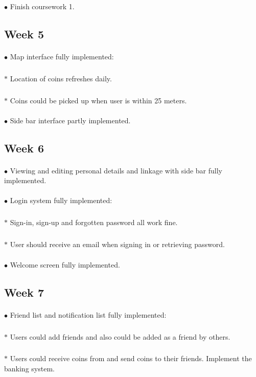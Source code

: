 \documentclass[paper=a4, fontsize=11pt]{scrartcl} %
\begin{document}
\paragraph{}$\bullet$ Finish coursework 1.
\subsection{Week 5}
\paragraph{}$\bullet$ Map interface fully implemented:
\subparagraph{}\quad $\ast$ Location of coins refreshes daily.
\subparagraph{}\quad $\ast$ Coins could be picked up when user is within 25 meters.
\paragraph{}$\bullet$ Side bar interface partly implemented.
\subsection{Week 6}
\paragraph{}$\bullet$ Viewing and editing personal details and linkage with side bar fully implemented.
\paragraph{}$\bullet$ Login system fully implemented:
\subparagraph{}\quad $\ast$ Sign-in, sign-up and forgotten password all work fine.
\subparagraph{}\quad $\ast$ User should receive an email when signing in or retrieving password.
\paragraph{}$\bullet$ Welcome screen fully implemented.
\subsection{Week 7}
\paragraph{}$\bullet$ Friend list and notification list fully implemented:
\subparagraph{}\quad $\ast$ Users could add friends and also could be added as a friend by others.
\subparagraph{}\quad $\ast$ Users could receive coins from and send coins to their friends.
Implement the banking system.
\end{document}
